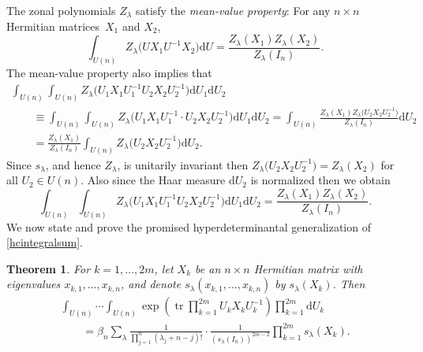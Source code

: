 \documentclass[10pt,a4paper]{amsart}
\numberwithin{equation}{section}
\newtheorem{Theorem}{Theorem}[section]
\def\dd{ \mathrm{d}}
\def\tr{\operatorname{tr} }
\begin{document}
The zonal polynomials $Z_\lambda$ satisfy the {\it mean-value property}: For any $n \times n$ Hermitian matrices~$X_1$ and $X_2$,
\begin{equation}
\int_{U(n)} Z_\lambda\bigl(UX_1U^{-1}X_2\bigr) \dd U = \frac{Z_\lambda(X_1) Z_\lambda(X_2)}{Z_\lambda(I_n)}.\label{meanvalue}
\end{equation}
The mean-value property also implies that
\begin{gather*}
\int_{U(n)} \int_{U(n)} Z_\lambda\bigl(U_1 X_1 U_1^{-1} U_2 X_2 U_2^{-1}\bigr) \dd U_1 \dd U_2 \\
\qquad\equiv \int_{U(n)} \int_{U(n)} Z_\lambda\bigl(U_1 X_1 U_1^{-1} \cdot U_2 X_2 U_2^{-1}\bigr) \dd U_1 \dd U_2 = \int_{U(n)} \frac{Z_\lambda(X_1) Z_\lambda\bigl(U_2 X_2 U_2^{-1}\bigr)}{Z_\lambda(I_n)} \dd U_2 \\
\qquad= \frac{Z_\lambda(X_1)}{Z_\lambda(I_n)} \int_{U(n)} Z_\lambda\bigl(U_2 X_2 U_2^{-1}\bigr) \dd U_2.
\end{gather*}
Since $s_\lambda$, and hence $Z_\lambda$, is unitarily invariant then $Z_\lambda\bigl(U_2 X_2 U_2^{-1}\bigr) = Z_\lambda(X_2)$ for all $U_2 \in U(n)$. Also since the Haar measure $\dd U_2$ is normalized then we obtain
\begin{equation}
\int_{U(n)} \int_{U(n)} Z_\lambda\bigl(U_1 X_1 U_1^{-1} U_2 X_2 U_2^{-1}\bigr) \dd U_1 \dd U_2 = \frac{Z_\lambda(X_1) Z_\lambda(X_2)}{Z_\lambda(I_n)}.\label{eq_iterated_mvp}
\end{equation}
We now state and prove the promised hyperdeterminantal generalization of \eqref{hcintegralsum}.

\begin{Theorem}
\label{thm_extd_hc}
For $k=1,\dots,2m$, let $X_k$ be an $n \times n$ Hermitian matrix with eigenvalues $x_{k,1},\dots,x_{k,n}$, and denote $s_\lambda(x_{k,1},\dots,x_{k,n})$ by $s_\lambda(X_k)$. Then
\begin{gather}
\int_{U(n)} \cdots \int_{U(n)} \exp\left(\tr \prod_{k=1}^{2m} U_k X_k U_k^{-1}\right) \prod_{k=1}^{2m} \dd U_k \nonumber\\
\qquad= \beta_n \sum_\lambda \frac{1}{\prod_{j=1}^n (\lambda_j + n-j)!} \cdot \frac{1}{(s_\lambda(I_n))^{2m-2}} \prod_{k=1}^{2m} s_\lambda(X_k).\label{hcextended}
\end{gather}
\end{Theorem}
\end{document}

